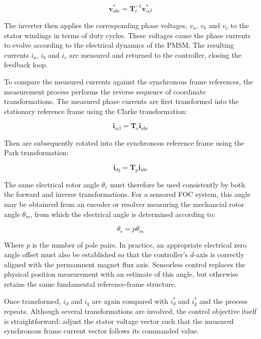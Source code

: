 \documentclass{article}
\begin{document}
\begin{equation}
    \mathbf{v}_{abc}^* = \mathbf{T}_c^{-1}\mathbf{v}_{\alpha\beta}^*
\end{equation}

The inverter then applies the corresponding phase voltages, $v_a$, $v_b$ and $v_c$ to the stator windings in terms of duty cycles. These voltages cause the phase currents to evolve according to the electrical dynamics of the PMSM. The resulting currents $i_a$, $i_b$ and $i_c$ are measured and returned to the controller, closing the feedback loop.

To compare the measured currents against the synchronous frame references, the measurement process performs the reverse sequence of coordinate transformations. The measured phase currents are first transformed into the stationary reference frame using the Clarke transformation:

\begin{equation}
    \mathbf{i}_{\alpha\beta} = \mathbf{T}_c\mathbf{i}_{abc}
\end{equation}

Then are subsequently rotated into the synchronous reference frame using the Park transformation:

\begin{equation}
    \mathbf{i}_{dq} = \mathbf{T}_p\mathbf{i}_{abc}
\end{equation}

The same electrical rotor angle $\theta_e$ must therefore be used consistently by both the forward and inverse transformations. For a sensored FOC system, this angle may be obtainred from an encoder or resolver measuring the mechancial rotor angle $\theta_m$, from which the electrical angle is determined according to:

\begin{equation}
    \theta_e = p\theta_m
\end{equation}

Where $p$ is the number of pole pairs. In practice, an appropriate electrical zero angle offset must also be established so that the controller's $d$-axis is correctly aligned with the permamnent magnet flux axis. Sensorless control replaces the physical position measurement with an estimate of this angle, but otherwise retains the same fundamental reference-frame structure.

Once transformed, $i_d$ and $i_q$ are again compared with $i_d^*$ and $i_q^*$ and the process repeats. Although several transformations are involved, the control objective itself is straightforward: adjust the stator voltage vector such that the measured synchronous frame current vector follows its commanded value. 
\end{document}
